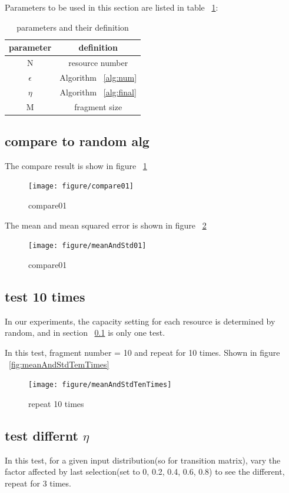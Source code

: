 \documentclass[11pt,a4paper]{article}
\begin{document}
Parameters to be used in this section are listed in table ~\ref {table:parameter}:
\begin{table}
\centering
\caption{parameters and their definition}
\begin{tabular}{|c|c|}
\hline
parameter & definition \\
\hline
N & resource number \\
\hline
$\epsilon$ & Algorithm ~\ref{alg:num} \\
\hline
$\eta$ & Algorithm ~\ref{alg:final} \\
\hline
M & fragment size \\
\hline
\end{tabular}
\label{table:parameter}
\end{table}

\subsection{\textbf{compare to random alg}}
\label{sec:test01}
The compare result is show in figure ~\ref {fig:compare01}
\begin{figure}[h]
\centering
\texttt{[image: figure/compare01]}
\caption{compare01}
\label{fig:compare01}
\end{figure}

The mean and mean squared error is shown in figure ~\ref{fig:meanAndStd01}
\begin{figure}[h]
\centering
\texttt{[image: figure/meanAndStd01]}
\caption{compare01}
\label{fig:meanAndStd01}
\end{figure}

\subsection{\textbf{test 10 times}}
\label{sec:repeatTenTimes}
In our experiments, the capacity setting for each resource is determined by random,
and in section ~\ref{sec:test01} is only one test.

In this test, fragment number = 10 and repeat for 10 times.
Shown in figure ~\ref{fig:meanAndStdTemTimes}
\begin{figure}[h]
\centering
\texttt{[image: figure/meanAndStdTenTimes]}
\caption{repeat 10 times}
\label{fig:meanAndStdTenTimes}
\end{figure}

\subsection{\textbf{test differnt $\eta$}}
In this test, for a given input distribution(so for transition matrix),
vary the factor affected by last selection(set to 0, 0.2, 0.4, 0.6, 0.8) to see the different,
repeat for 3 times.
\end{document}
